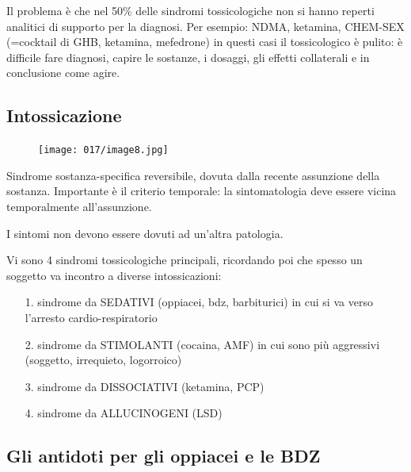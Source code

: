 Il problema è che nel 50\% delle sindromi tossicologiche non si hanno
reperti analitici di supporto per la diagnosi. Per esempio: NDMA,
ketamina, CHEM-SEX (=cocktail di GHB, ketamina, mefedrone) in questi
casi il tossicologico è pulito: è difficile fare diagnosi, capire le
sostanze, i dosaggi, gli effetti collaterali e in conclusione come
agire.

\subsection{Intossicazione}

\begin{figure}[!ht]
\centering
	\texttt{[image: 017/image8.jpg]}
\end{figure}

Sindrome sostanza-specifica reversibile, dovuta dalla recente assunzione
della sostanza. Importante è il criterio temporale: la sintomatologia
deve essere vicina temporalmente all'assunzione.

I sintomi non devono essere dovuti ad un'altra patologia.

Vi sono 4 sindromi tossicologiche principali, ricordando poi che spesso
un soggetto va incontro a diverse intossicazioni:

\begin{itemize}
\item[1.]
  sindrome da SEDATIVI (oppiacei, bdz, barbiturici) in cui si va verso
  l'arresto cardio-respiratorio
\item[2.]
  sindrome da STIMOLANTI (cocaina, AMF) in cui sono più aggressivi
  (soggetto, irrequieto, logorroico)
\item[3.]
  sindrome da DISSOCIATIVI (ketamina, PCP)
\item[4.]
  sindrome da ALLUCINOGENI (LSD)
\end{itemize}

\subsection{Gli antidoti per gli oppiacei e le BDZ}

